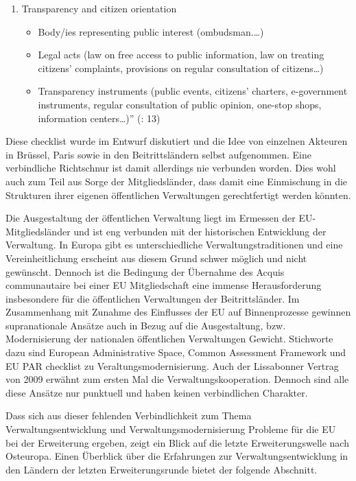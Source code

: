 \begin{enumerate}
\begin{itemize}
\end{itemize}
\item Transparency and citizen orientation 
\begin{itemize}
\item Body/ies representing public interest (ombudsman.…)
\item Legal acts (law on free access to public information, law on treating citizens’ complaints, provisions on regular consultation of citizens…) 
\item Transparency instruments (public events, citizens’ charters, e-government instruments, regular consultation of public opinion, one-stop shops, information centers…)”
(\cite{butiu}: 13)
\end{itemize}
\end{enumerate}

Diese checklist wurde im Entwurf diskutiert und die Idee von einzelnen Akteuren in Brüssel, Paris sowie in den Beitrittsländern selbst aufgenommen. Eine verbindliche Richtschnur ist damit allerdings nie verbunden worden. Dies wohl auch zum Teil aus Sorge der Mitgliedsländer, dass damit eine Einmischung in die Strukturen ihrer eigenen öffentlichen Verwaltungen gerechtfertigt werden könnten. \par
Die Ausgestaltung der öffentlichen Verwaltung liegt im Ermessen der EU-Mitgliedsländer und ist eng verbunden mit der historischen Entwicklung der Verwaltung. In Europa gibt es unterschiedliche Verwaltungstraditionen und eine Vereinheitlichung erscheint aus diesem Grund schwer möglich und nicht gewünscht. Dennoch ist die Bedingung der Übernahme des Acquis communautaire bei einer EU Mitgliedschaft eine immense Herausforderung insbesondere für die öffentlichen Verwaltungen der Beitrittsländer. Im Zusammenhang mit Zunahme des Einflusses der EU auf Binnenprozesse gewinnen supranationale Ansätze auch in Bezug auf die Ausgestaltung, bzw. Modernisierung der nationalen öffentlichen Verwaltungen Gewicht. Stichworte dazu sind European Administrative Space, Common Assessment Framework und EU PAR checklist zu Veraltungsmodernisierung. Auch der Lissabonner Vertrag von 2009 erwähnt zum ersten Mal die Verwaltungskooperation. Dennoch sind alle diese Ansätze nur punktuell und haben keinen verbindlichen Charakter.\par
Dass sich aus dieser fehlenden Verbindlichkeit zum Thema Verwaltungsentwicklung und Verwaltungsmodernisierung Probleme für die EU bei der Erweiterung ergeben, zeigt ein Blick auf die letzte Erweiterungswelle nach Osteuropa. Einen Überblick über die Erfahrungen zur Verwaltungsentwicklung in den Ländern der letzten Erweiterungsrunde bietet der folgende Abschnitt.

